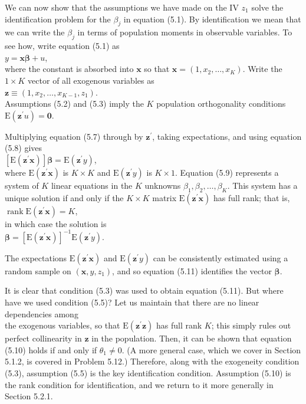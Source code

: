 \documentclass[10pt]{article}
\begin{document}
We can now show that the assumptions we have made on the IV $z_{1}$ solve the identification problem for the $\beta_{j}$ in equation (5.1). By identification we mean that we can write the $\beta_{j}$ in terms of population moments in observable variables. To see how, write equation (5.1) as\\
$y=\mathbf{x} \boldsymbol{\beta}+u$,\\
where the constant is absorbed into $\mathbf{x}$ so that $\mathbf{x}=\left(1, x_{2}, \ldots, x_{K}\right)$. Write the $1 \times K$ vector of all exogenous variables as\\
$\mathbf{z} \equiv\left(1, x_{2}, \ldots, x_{K-1}, z_{1}\right)$.\\
Assumptions (5.2) and (5.3) imply the $K$ population orthogonality conditions\\
$\mathrm{E}\left(\mathbf{z}^{\prime} u\right)=\mathbf{0}$.

Multiplying equation (5.7) through by $\mathbf{z}^{\prime}$, taking expectations, and using equation (5.8) gives\\
$\left[\mathrm{E}\left(\mathbf{z}^{\prime} \mathbf{x}\right)\right] \boldsymbol{\beta}=\mathrm{E}\left(\mathbf{z}^{\prime} y\right)$,\\
where $\mathrm{E}\left(\mathbf{z}^{\prime} \mathbf{x}\right)$ is $K \times K$ and $\mathrm{E}\left(\mathbf{z}^{\prime} y\right)$ is $K \times 1$. Equation (5.9) represents a system of $K$ linear equations in the $K$ unknowns $\beta_{1}, \beta_{2}, \ldots, \beta_{K}$. This system has a unique solution if and only if the $K \times K$ matrix $\mathrm{E}\left(\mathbf{z}^{\prime} \mathbf{x}\right)$ has full rank; that is,\\
$\operatorname{rank} \mathrm{E}\left(\mathbf{z}^{\prime} \mathbf{x}\right)=K$,\\
in which case the solution is\\
$\boldsymbol{\beta}=\left[\mathrm{E}\left(\mathbf{z}^{\prime} \mathbf{x}\right)\right]^{-1} \mathrm{E}\left(\mathbf{z}^{\prime} y\right)$.

The expectations $\mathrm{E}\left(\mathbf{z}^{\prime} \mathbf{x}\right)$ and $\mathrm{E}\left(\mathbf{z}^{\prime} y\right)$ can be consistently estimated using a random sample on $\left(\mathbf{x}, y, z_{1}\right)$, and so equation (5.11) identifies the vector $\boldsymbol{\beta}$.

It is clear that condition (5.3) was used to obtain equation (5.11). But where have we used condition (5.5)? Let us maintain that there are no linear dependencies among\\
the exogenous variables, so that $\mathrm{E}\left(\mathbf{z}^{\prime} \mathbf{z}\right)$ has full rank $K$; this simply rules out perfect collinearity in $\mathbf{z}$ in the population. Then, it can be shown that equation (5.10) holds if and only if $\theta_{1} \neq 0$. (A more general case, which we cover in Section 5.1.2, is covered in Problem 5.12.) Therefore, along with the exogeneity condition (5.3), assumption (5.5) is the key identification condition. Assumption (5.10) is the rank condition for identification, and we return to it more generally in Section 5.2.1.
\end{document}
